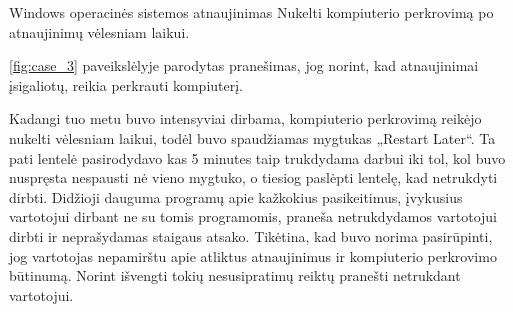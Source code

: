 ﻿\begin{xcase}{Windows operacinės sistemos atnaujinimas}
  \xcgoal
  {
    Nukelti kompiuterio perkrovimą po atnaujinimų vėlesniam laikui.
  }
  \xctools
  {
    \ref{fig:case_3} paveikslėlyje parodytas pranešimas, jog norint, kad atnaujinimai įsigaliotų, reikia perkrauti kompiuterį.

  }
  \xcresult
  {
    Kadangi tuo metu buvo intensyviai dirbama, kompiuterio perkrovimą reikėjo nukelti vėlesniam laikui, todėl buvo spaudžiamas mygtukas „Restart Later“. Ta pati lentelė pasirodydavo kas 5 minutes taip trukdydama darbui iki tol, kol buvo nuspręsta nespausti nė vieno mygtuko, o tiesiog paslėpti lentelę, kad netrukdyti dirbti.
  }
  \xcprinciples
  {
	{
	  Didžioji dauguma programų apie kažkokius pasikeitimus, įvykusius vartotojui dirbant ne su tomis programomis, praneša netrukdydamos vartotojui dirbti ir neprašydamas staigaus atsako.
	}
  }
  \xcthoughts
  {
    Tikėtina, kad buvo norima pasirūpinti, jog vartotojas nepamirštu apie atliktus atnaujinimus ir kompiuterio perkrovimo būtinumą. Norint išvengti tokių nesusipratimų reiktų pranešti netrukdant vartotojui.
  }
\end{xcase}